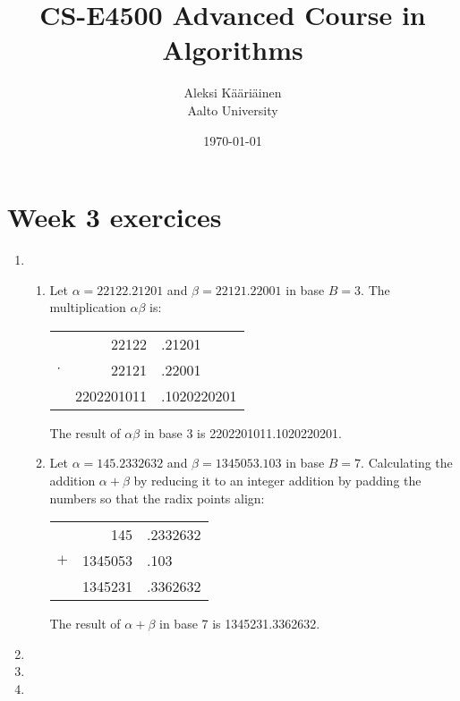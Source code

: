 \documentclass[11pt,a4paper]{article}
\title{CS-E4500 Advanced Course in Algorithms}
\author{Aleksi Kääriäinen  \\
	Aalto University  \\
	}
\begin{document}
\date{\today}

\maketitle

\newpage

\section*{Week 3 exercices}

\begin{enumerate}
    \item
          \begin{enumerate}
              \item Let $\alpha= 22122.21201$ and $\beta = 22121.22001$ in base $B = 3$. The multiplication $\alpha \beta$ is:
                    \begin{center}
                        \begin{tabular}{crl}
                                    & 22122&.21201           \\
                            $\cdot$ & 22121&.22001           \\
                            \hline
                                    & 2202201011&.1020220201 \\
                        \end{tabular}
                    \end{center}
                    The result of $\alpha \beta$ in base 3 is 2202201011.1020220201.

              \item Let $\alpha = 145.2332632$ and $\beta = 1345053.103$ in base $B = 7$. Calculating the addition $\alpha + \beta$
              by reducing it to an integer addition by padding the numbers so that the radix points align:
                    \begin{center}
                        \begin{tabular}{crl}
                                & 145     & .2332632 \\
                            $+$ & 1345053 & .103     \\
                            \hline
                                & 1345231 & .3362632 \\
                        \end{tabular}
                    \end{center}
                    The result of $\alpha + \beta$ in base 7 is 1345231.3362632.
          \end{enumerate}
          \newpage

    \item

          \newpage

    \item

          \newpage

    \item

          \newpage
\end{enumerate}
\end{document}
